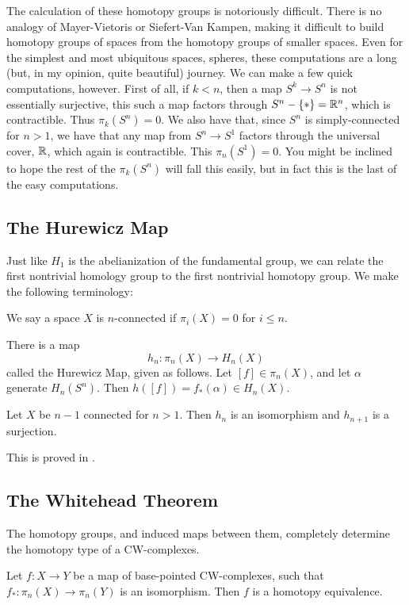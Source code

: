 The calculation of these homotopy groups is notoriously difficult.  
There is no analogy of Mayer-Vietoris or Siefert-Van Kampen, making it difficult to build homotopy groups of spaces from the homotopy groups of smaller spaces.
Even for the simplest and most ubiquitous spaces, spheres, these computations are a long (but, in my opinion, quite beautiful) journey.  
We can make a few quick computations, however.  
First of all, if $k<n$, then a map $S^k\to S^n$ is not essentially surjective, this such a map factors through $S^n-\{*\}=\mathbb{R}^n$, which is contractible.  
Thus $\pi_k(S^n)=0$.  
We also have that, since $S^n$ is simply-connected for $n>1$, we have that any map from $S^n\to S^1$ factors through the universal cover, $\mathbb{R}$, which again is contractible.  
This $\pi_n(S^1)=0$.  
You might be inclined to hope the rest of the $\pi_k(S^n)$ will fall this easily, but in fact this is the last of the easy computations.  

\subsection{The Hurewicz Map}

Just like $H_1$ is the abelianization of the fundamental group, we can relate the first nontrivial homology group to the first nontrivial homotopy group.  
We make the following terminology:
\begin{Def}
We say a space $X$ is $n$-connected if $\pi_i(X)=0$ for $i\le n$.
\end{Def}


There is a map 
\[h_n:\pi_n(X)\to H_n(X)\]
called the Hurewicz Map, given as follows.  Let $[f]\in \pi_n(X)$, and let $\alpha$ generate $H_n(S^n)$.  
Then $h([f])=f_*(\alpha)\in H_n(X)$.  
\begin{Theorem}
  Let $X$ be $n-1$ connected for $n>1$.  
  Then $h_n$ is an isomorphism and $h_{n+1}$ is a surjection.  
\end{Theorem}

This is proved in \cite[Thm~4.32]{HatcherAT}.

\subsection{The Whitehead Theorem}
The homotopy groups, and induced maps between them, completely determine the homotopy type of a CW-complexes.  

\begin{Theorem}
  Let $f:X\to Y$ be a map of base-pointed CW-complexes, such that $f_*:\pi_n(X)\to \pi_n(Y)$ is an isomorphism.  Then $f$ is a homotopy equivalence.  
\end{Theorem}

